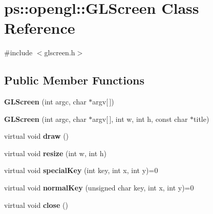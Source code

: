 \hypertarget{classps_1_1opengl_1_1GLScreen}{}\section{ps\+:\+:opengl\+:\+:G\+L\+Screen Class Reference}
\label{classps_1_1opengl_1_1GLScreen}


{\ttfamily \#include $<$glscreen.\+h$>$}

\subsection*{Public Member Functions}
\begin{DoxyCompactItemize}
\item 
\hypertarget{classps_1_1opengl_1_1GLScreen_a20ea8ab3fe637a71fd6a322e8c9a9e57}{}{\bfseries G\+L\+Screen} (int argc, char $\ast$argv\mbox{[}$\,$\mbox{]})\label{classps_1_1opengl_1_1GLScreen_a20ea8ab3fe637a71fd6a322e8c9a9e57}

\item 
\hypertarget{classps_1_1opengl_1_1GLScreen_ad1118a7645d4cfc1e15a2895f0d242ec}{}{\bfseries G\+L\+Screen} (int argc, char $\ast$argv\mbox{[}$\,$\mbox{]}, int w, int h, const char $\ast$title)\label{classps_1_1opengl_1_1GLScreen_ad1118a7645d4cfc1e15a2895f0d242ec}

\item 
\hypertarget{classps_1_1opengl_1_1GLScreen_afcba16784a6867bf43cdf1aa852103dc}{}virtual void {\bfseries draw} ()\label{classps_1_1opengl_1_1GLScreen_afcba16784a6867bf43cdf1aa852103dc}

\item 
\hypertarget{classps_1_1opengl_1_1GLScreen_a3f80cbf7d871dc79c8ddb933bc3574d0}{}virtual void {\bfseries resize} (int w, int h)\label{classps_1_1opengl_1_1GLScreen_a3f80cbf7d871dc79c8ddb933bc3574d0}

\item 
\hypertarget{classps_1_1opengl_1_1GLScreen_a055e9c854630528dc49842fceba4fcc3}{}virtual void {\bfseries special\+Key} (int key, int x, int y)=0\label{classps_1_1opengl_1_1GLScreen_a055e9c854630528dc49842fceba4fcc3}

\item 
\hypertarget{classps_1_1opengl_1_1GLScreen_a1671b55a82d64fb49173b859444842cd}{}virtual void {\bfseries normal\+Key} (unsigned char key, int x, int y)=0\label{classps_1_1opengl_1_1GLScreen_a1671b55a82d64fb49173b859444842cd}

\item 
\hypertarget{classps_1_1opengl_1_1GLScreen_aee7a1570a8838d31d7f65e2a370e8970}{}virtual void {\bfseries close} ()\label{classps_1_1opengl_1_1GLScreen_aee7a1570a8838d31d7f65e2a370e8970}

\end{DoxyCompactItemize}
